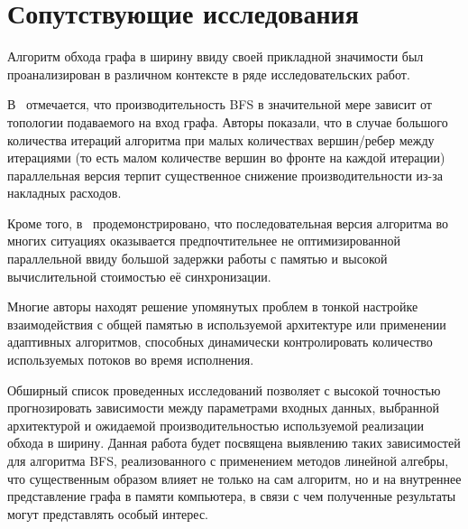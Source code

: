 
\section{Сопутствующие исследования}
\label{sec:relatedworks}
Алгоритм обхода графа в ширину ввиду своей прикладной значимости был проанализирован в различном контексте в ряде исследовательских работ. 

В~\cite{adaptiveBFS} отмечается, что производительность BFS в значительной мере зависит от топологии подаваемого на вход графа. Авторы показали, что в случае большого количества итераций алгоритма при малых количествах вершин/ребер между итерациями (то есть малом количестве вершин во фронте на каждой итерации) параллельная версия терпит существенное снижение производительности из-за накладных расходов.

Кроме того, в~\cite{scalableBFS} продемонстрировано, что последовательная версия алгоритма во многих ситуациях оказывается предпочтительнее не оптимизированной параллельной ввиду большой задержки работы с памятью и высокой вычислительной стоимостью её синхронизации. 

Многие авторы находят решение упомянутых проблем в тонкой настройке взаимодействия с общей памятью в используемой архитектуре или применении адаптивных алгоритмов, способных динамически контролировать количество используемых потоков во время исполнения.

Обширный список проведенных исследований позволяет с высокой точностью прогнозировать зависимости между параметрами входных данных, выбранной архитектурой и ожидаемой производительностью используемой реализации обхода в ширину. Данная работа будет посвящена выявлению таких зависимостей для алгоритма BFS, реализованного с применением методов линейной алгебры, что существенным образом влияет не только на сам алгоритм, но и на внутреннее представление графа в памяти компьютера, в связи с чем полученные результаты могут представлять особый интерес.

